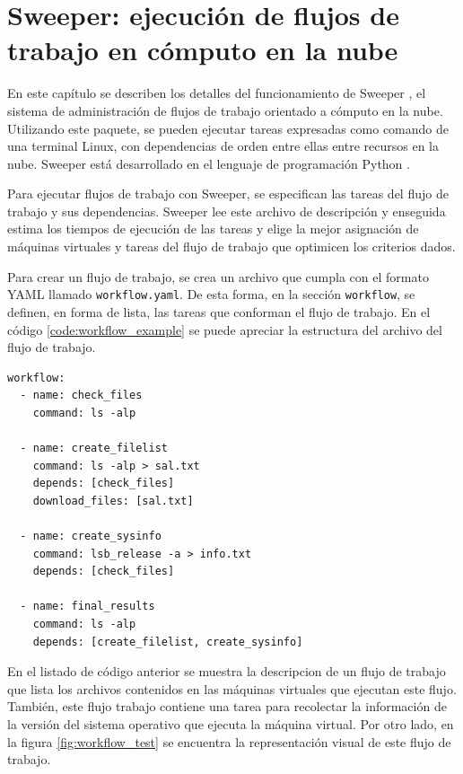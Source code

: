 \chapter[Sweeper]{Sweeper: ejecución de flujos de trabajo en cómputo en la nube}
\label{chap:sweeper}

En este capítulo se describen los detalles del funcionamiento de Sweeper \cite{dominofire2015sweeper}, el sistema de administración de flujos de trabajo orientado a cómputo en la nube. Utilizando este paquete, se pueden ejecutar tareas expresadas como comando de una terminal Linux, con dependencias de orden entre ellas entre recursos en la nube. Sweeper está desarrollado en el lenguaje de programación Python \cite{python3}.

Para ejecutar flujos de trabajo con Sweeper, se especifican las tareas del flujo de trabajo y sus dependencias. Sweeper lee este archivo de descripción y enseguida estima los tiempos de ejecución de las tareas y elige la mejor asignación de máquinas virtuales y tareas del flujo de trabajo que optimicen los criterios dados.

Para crear un flujo de trabajo, se crea un archivo que cumpla con el formato YAML \cite{dot2015yaml} llamado \texttt{workflow.yaml}. De esta forma, en la sección \texttt{workflow}, se definen, en forma de lista, las tareas que conforman el flujo de trabajo. En el código \ref{code:workflow_example} se puede apreciar la estructura del archivo del flujo de trabajo.  

\begin{lstlisting}[label={code:workflow_example},caption={Flujo de trabajo de ejemplo.},float]
workflow:
  - name: check_files
    command: ls -alp

  - name: create_filelist
    command: ls -alp > sal.txt
    depends: [check_files]
    download_files: [sal.txt]

  - name: create_sysinfo
    command: lsb_release -a > info.txt
    depends: [check_files]

  - name: final_results
    command: ls -alp
    depends: [create_filelist, create_sysinfo]
\end{lstlisting}

En el listado de código anterior se muestra la descripcion de un flujo de trabajo que lista los archivos contenidos en las máquinas virtuales que ejecutan este flujo. También, este flujo trabajo contiene una tarea para recolectar la información de la versión del sistema operativo que ejecuta la máquina virtual. Por otro lado, en la figura \ref{fig:workflow_test} se encuentra la representación visual de este flujo de trabajo. 

